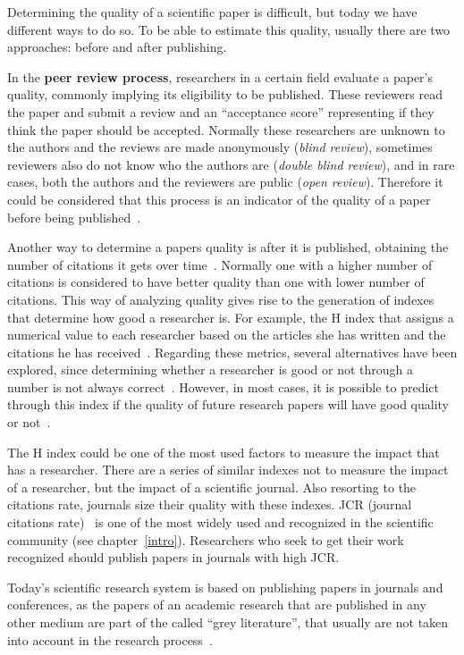 Determining the quality of a scientific paper is difficult, but today we have
different ways to do so. To be able to estimate this quality, usually there are
two approaches: before and after publishing.

In the \textbf{peer review process}, researchers in a certain field evaluate a
paper's quality, commonly implying its eligibility to be published. These
reviewers read the paper and submit a review and an ``acceptance score''
representing if they think the paper should be accepted. Normally these
researchers are unknown to the authors and the reviews are made anonymously
(\emph{blind review}), sometimes reviewers also do not know who the authors are
(\emph{double blind review}), and in rare cases, both the authors and the
reviewers are public (\emph{open review}). Therefore it could be considered that
this process is an indicator of the quality of a paper before being
published~\cite{szklo2006quality}.

Another way to determine a papers quality is after it is published, obtaining
the number of citations it gets over time~\cite{redner1998popular}. Normally one
with a higher number of citations is considered to have better quality than one
with lower number of citations. This way of analyzing quality gives rise to the
generation of indexes that determine how good a researcher is. For example, the
H index that assigns a numerical value to each researcher based on the articles
she has written and the citations he has received~\cite{bornmann2007we}.
Regarding these metrics, several alternatives have been explored, since
determining whether a researcher is good or not through a number is not always
correct~\cite{bornmann2008there}. However, in most cases, it is possible to
predict through this index if the quality of future research papers will have
good quality or not~\cite{hirsch2007does}.

The H index could be one of the most used factors to measure the impact that has
a researcher. There are a series of similar indexes not to measure the impact of
a researcher, but the impact of a scientific journal. Also resorting to the
citations rate, journals size their quality with these indexes. JCR (journal
citations rate)~\cite{doi:10.1001/jama.295.1.90} is one of the most widely used
and recognized in the scientific community (see chapter~\ref{intro}).
Researchers who seek to get their work recognized should publish papers in
journals with high JCR.

Today's scientific research system is based on publishing papers in journals and
conferences, as the papers of an academic research that are published in any
other medium are part of the called ``grey literature'', that usually are not
taken into account in the research process~\cite{rothstein2009grey}.

